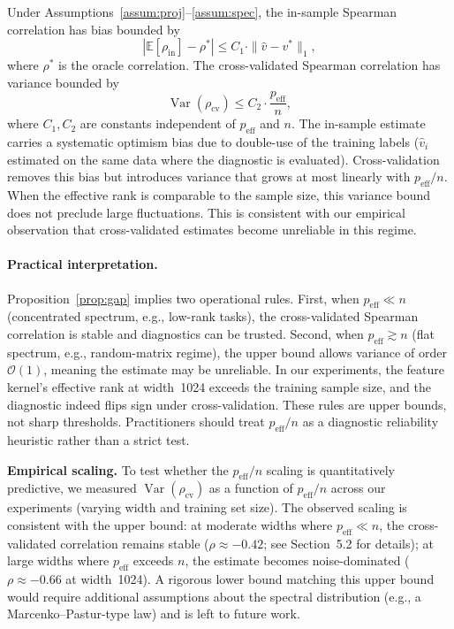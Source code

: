 \documentclass[twoside,11pt]{article}
\begin{document}
\begin{proposition}
\label{prop:gap}
Under Assumptions~\ref{assum:proj}--\ref{assum:spec}, the in-sample Spearman correlation has bias bounded by
\[
|\mathbb{E}[\rho_{\text{in}}] - \rho^*| \leq C_1 \cdot \|\hat{v} - v^*\|_1,
\]
where $\rho^*$ is the oracle correlation.  The cross-validated Spearman correlation has variance bounded by
\[
\operatorname{Var}(\rho_{\text{cv}}) \leq C_2 \cdot \frac{p_{\text{eff}}}{n},
\]
where $C_1, C_2$ are constants independent of $p_{\text{eff}}$ and $n$.  The in-sample estimate carries a systematic optimism bias due to double-use of the training labels ($\hat{v}_i$ estimated on the same data where the diagnostic is evaluated).  Cross-validation removes this bias but introduces variance that grows at most linearly with $p_{\text{eff}} / n$.  When the effective rank is comparable to the sample size, this variance bound does not preclude large fluctuations. This is consistent with our empirical observation that cross-validated estimates become unreliable in this regime.

\paragraph{Practical interpretation.}  Proposition~\ref{prop:gap} implies two operational rules.  First, when $p_{\text{eff}} \ll n$ (concentrated spectrum, e.g., low-rank tasks), the cross-validated Spearman correlation is stable and diagnostics can be trusted.  Second, when $p_{\text{eff}} \gtrsim n$ (flat spectrum, e.g., random-matrix regime), the upper bound allows variance of order $\mathcal{O}(1)$, meaning the estimate may be unreliable.  In our experiments, the feature kernel's effective rank at width~1024 exceeds the training sample size, and the diagnostic indeed flips sign under cross-validation.  These rules are upper bounds, not sharp thresholds. Practitioners should treat $p_{\text{eff}} / n$ as a diagnostic reliability heuristic rather than a strict test.

\noindent\textbf{Empirical scaling.}  To test whether the $p_{\text{eff}} / n$ scaling is quantitatively predictive, we measured $\operatorname{Var}(\rho_{\text{cv}})$ as a function of $p_{\text{eff}} / n$ across our experiments (varying width and training set size).  The observed scaling is consistent with the upper bound: at moderate widths where $p_{\text{eff}} \ll n$, the cross-validated correlation remains stable ($\rho \approx -0.42$; see Section~5.2 for details); at large widths where $p_{\text{eff}}$ exceeds $n$, the estimate becomes noise-dominated ($\rho \approx -0.66$ at width~1024).  A rigorous lower bound matching this upper bound would require additional assumptions about the spectral distribution (e.g., a Marcenko--Pastur-type law) and is left to future work.
\end{proposition}
\end{document}
